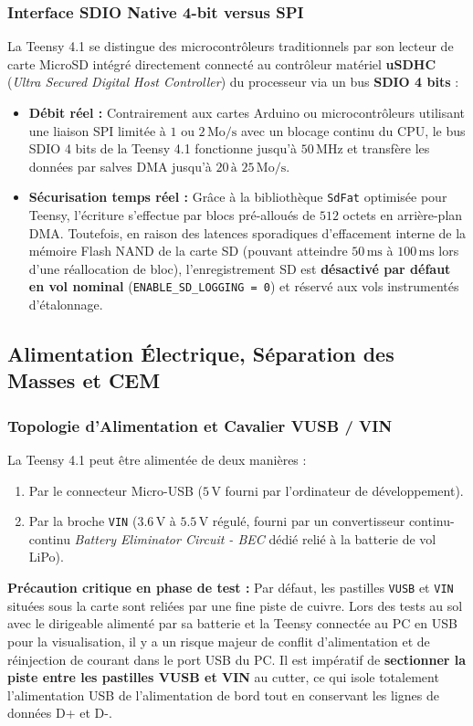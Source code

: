 \documentclass[../Materiel.tex]{subfiles}
\begin{document}
\subsubsection{Interface SDIO Native 4-bit versus SPI}
La Teensy 4.1 se distingue des microcontrôleurs traditionnels par son lecteur de carte MicroSD intégré directement connecté au contrôleur matériel \textbf{uSDHC} (\textit{Ultra Secured Digital Host Controller}) du processeur via un bus \textbf{SDIO 4 bits} :
\begin{itemize}
    \item \textbf{Débit réel :} Contrairement aux cartes Arduino ou microcontrôleurs utilisant une liaison SPI limitée à $1$ ou $2\,\text{Mo/s}$ avec un blocage continu du CPU, le bus SDIO 4 bits de la Teensy 4.1 fonctionne jusqu'à $50\,\text{MHz}$ et transfère les données par salves DMA jusqu'à $20\,\text{à }25\,\text{Mo/s}$.
    \item \textbf{Sécurisation temps réel :} Grâce à la bibliothèque \lstinline|SdFat| optimisée pour Teensy, l'écriture s'effectue par blocs pré-alloués de $512$ octets en arrière-plan DMA. Toutefois, en raison des latences sporadiques d'effacement interne de la mémoire Flash NAND de la carte SD (pouvant atteindre $50\,\text{ms}$ à $100\,\text{ms}$ lors d'une réallocation de bloc), l'enregistrement SD est \textbf{désactivé par défaut en vol nominal} (\lstinline|ENABLE_SD_LOGGING = 0|) et réservé aux vols instrumentés d'étalonnage.
\end{itemize}

\subsection{Alimentation Électrique, Séparation des Masses et CEM}

\subsubsection{Topologie d'Alimentation et Cavalier VUSB / VIN}
La Teensy 4.1 peut être alimentée de deux manières :
\begin{enumerate}
    \item Par le connecteur Micro-USB ($5\,\text{V}$ fourni par l'ordinateur de développement).
    \item Par la broche \texttt{VIN} ($3.6\,\text{V}$ à $5.5\,\text{V}$ régulé, fourni par un convertisseur continu-continu \textit{Battery Eliminator Circuit - BEC} dédié relié à la batterie de vol LiPo).
\end{enumerate}
\textbf{Précaution critique en phase de test :} Par défaut, les pastilles \texttt{VUSB} et \texttt{VIN} situées sous la carte sont reliées par une fine piste de cuivre. Lors des tests au sol avec le dirigeable alimenté par sa batterie et la Teensy connectée au PC en USB pour la visualisation, il y a un risque majeur de conflit d'alimentation et de réinjection de courant dans le port USB du PC. Il est impératif de \textbf{sectionner la piste entre les pastilles VUSB et VIN} au cutter, ce qui isole totalement l'alimentation USB de l'alimentation de bord tout en conservant les lignes de données D+ et D-.
\end{document}
